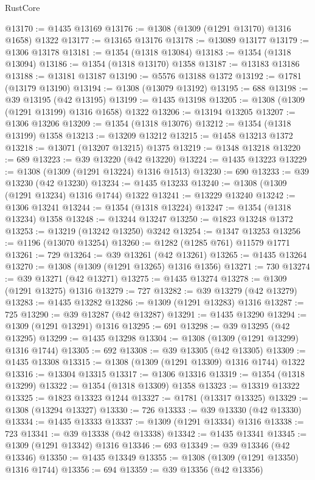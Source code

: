 \begin{lexlean}{RustCore}
\begin{coremodule}
@13170 := @1435 @13169
@13176 := @1308 (@1309 (@1291 @13170) @1316 @1658) @1322
@13177 := @13165 @13176
@13178 := @13089 @13177
@13179 := @1306 @13178
@13181 := @1354 (@1318 @13084)
@13183 := @1354 (@1318 @13094)
@13186 := @1354 (@1318 @13170) @1358
@13187 := @13183 @13186
@13188 := @13181 @13187
@13190 := @5576 @13188 @1372
@13192 := @1781 (@13179 @13190)
@13194 := @1308 (@13079 @13192)
@13195 := 688
@13198 := @39 @13195 (@42 @13195)
@13199 := @1435 @13198
@13205 := @1308 (@1309 (@1291 @13199) @1316 @1658) @1322
@13206 := @13194 @13205
@13207 := @1306 @13206
@13209 := @1354 (@1318 @13076)
@13212 := @1354 (@1318 @13199) @1358
@13213 := @13209 @13212
@13215 := @1458 @13213 @1372
@13218 := @13071 (@13207 @13215) @1375
@13219 := @1348 @13218
@13220 := 689
@13223 := @39 @13220 (@42 @13220)
@13224 := @1435 @13223
@13229 := @1308 (@1309 (@1291 @13224) @1316 @1513)
@13230 := 690
@13233 := @39 @13230 (@42 @13230)
@13234 := @1435 @13233
@13240 := @1308 (@1309 (@1291 @13234) @1316 @1744) @1322
@13241 := @13229 @13240
@13242 := @1306 @13241
@13244 := @1354 (@1318 @13224)
@13247 := @1354 (@1318 @13234) @1358
@13248 := @13244 @13247
@13250 := @1823 @13248 @1372
@13253 := @13219 (@13242 @13250) @3242
@13254 := @1347 @13253
@13256 := @1196 (@13070 @13254)
@13260 := @1282 (@1285 @761) @11579 @1771
@13261 := 729
@13264 := @39 @13261 (@42 @13261)
@13265 := @1435 @13264
@13270 := @1308 (@1309 (@1291 @13265) @1316 @1356)
@13271 := 730
@13274 := @39 @13271 (@42 @13271)
@13275 := @1435 @13274
@13278 := @1309 (@1291 @13275) @1316
@13279 := 727
@13282 := @39 @13279 (@42 @13279)
@13283 := @1435 @13282
@13286 := @1309 (@1291 @13283) @1316
@13287 := 725
@13290 := @39 @13287 (@42 @13287)
@13291 := @1435 @13290
@13294 := @1309 (@1291 @13291) @1316
@13295 := 691
@13298 := @39 @13295 (@42 @13295)
@13299 := @1435 @13298
@13304 := @1308 (@1309 (@1291 @13299) @1316 @1744)
@13305 := 692
@13308 := @39 @13305 (@42 @13305)
@13309 := @1435 @13308
@13315 := @1308 (@1309 (@1291 @13309) @1316 @1744) @1322
@13316 := @13304 @13315
@13317 := @1306 @13316
@13319 := @1354 (@1318 @13299)
@13322 := @1354 (@1318 @13309) @1358
@13323 := @13319 @13322
@13325 := @1823 @13323 @1244
@13327 := @1781 (@13317 @13325)
@13329 := @1308 (@13294 @13327)
@13330 := 726
@13333 := @39 @13330 (@42 @13330)
@13334 := @1435 @13333
@13337 := @1309 (@1291 @13334) @1316
@13338 := 723
@13341 := @39 @13338 (@42 @13338)
@13342 := @1435 @13341
@13345 := @1309 (@1291 @13342) @1316
@13346 := 693
@13349 := @39 @13346 (@42 @13346)
@13350 := @1435 @13349
@13355 := @1308 (@1309 (@1291 @13350) @1316 @1744)
@13356 := 694
@13359 := @39 @13356 (@42 @13356)

\end{coremodule}
\end{lexlean}
